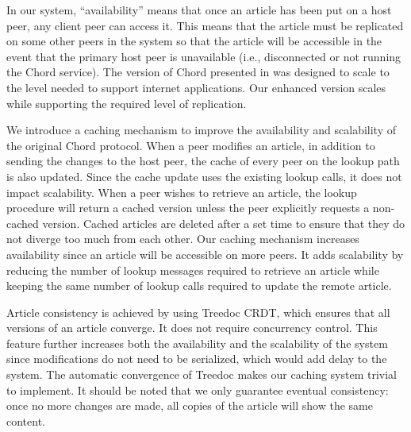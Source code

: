\documentclass[twocolumn]{article}
\begin{document}
In our system, ``availability'' means that once an article has been put on a host peer, any client peer can access it. This means that the article must be replicated on some other peers in the system so that the article will be accessible in the event that the primary host peer is unavailable (i.e., disconnected or not running the Chord service). The version of Chord presented in \cite{c1} was designed to scale to the level needed to support internet applications. Our enhanced version scales while supporting the required level of replication.

We introduce a caching mechanism to improve the availability and scalability of the original Chord protocol. When a peer modifies an article, in addition to sending the changes to the host peer, the cache of every peer on the lookup path is also updated. Since the cache update uses the existing lookup calls, it does not impact scalability. When a peer wishes to retrieve an article, the lookup procedure will return a cached version unless the peer explicitly requests a non-cached version. Cached articles are deleted after a set time to ensure that they do not diverge too much from each other. Our caching mechanism increases availability since an article will be accessible on more peers. It adds scalability by reducing the number of lookup messages required to retrieve an article while keeping the same number of lookup calls required to update the remote article.

Article consistency is achieved by using Treedoc CRDT, which ensures that all versions of an article converge. It does not require concurrency control. This feature further increases both the availability and the scalability of the system since modifications do not need to be serialized, which would add delay to the system. The automatic convergence of Treedoc makes our caching system trivial to implement. It should be noted that we only guarantee eventual consistency: once no more changes are made, all copies of the article will show the same content.
\end{document}
